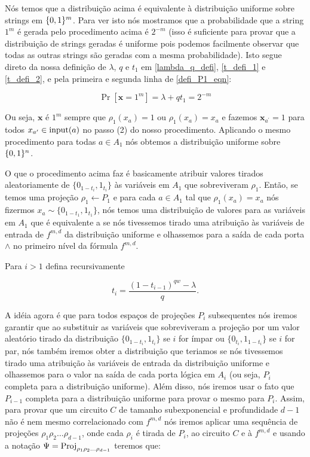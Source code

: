 Nós temos que a distribuição acima é equivalente à distribuição uniforme sobre strings em $\{0, 1\}^{m}$. Para ver isto nós mostramos que a probabilidade que a string $1^{m}$ é gerada pelo procedimento acima é $2^{-m}$ (isso é suficiente para provar que a distribuição de strings geradas é uniforme pois podemos facilmente observar que todas as outras strings são geradas com a mesma probabilidade). Isto segue direto da nossa definição de $\lambda$, $q$ e $t_{1}$ em \ref{lambda_q_defi}, \ref{t_defi_1} e \ref{t_defi_2}, e pela primeira e segunda linha de \ref{defi_P1_eqn}:

\begin{equation*}
	\Pr[\textbf{x} = 1^{m}]  = \lambda + qt_{1} = 2^{-m}
\end{equation*}

Ou seja, $\textbf{x}$ é $1^{m}$ sempre que $\rho_{1}(x_{a}) = 1$ ou $\rho_{1}(x_{a}) = x_{a}$ e fazemos $\textbf{x}_{a^{\prime}} = 1$ para todos $x_{a^{\prime}} \in \text{input}(a)$ no passo (2) do nosso procedimento. Aplicando o mesmo procedimento para todas $a \in A_{1}$ nós obtemos a distribuição uniforme sobre $\{0, 1\}^{n}$.

O que o procedimento acima faz é basicamente atribuir valores tirados aleatoriamente de $\{0_{1 - t_{i}}, 1_{t_{i}}\}$ às variáveis em $A_{1}$ que sobreviveram $\rho_{1}$. Então, se temos uma projeção $\rho_{1} \leftarrow P_{1}$ e para cada $a \in A_{1}$ tal que $\rho_{1}(x_{a}) = x_{a}$ nós fizermos $x_{a} \sim \{0_{1 - t_{1}}, 1_{t_{1}}\}$, nós temos uma distribuição de valores para as variáveis em $A_{1}$ que é equivalente a se nós tivessemos tirado uma atribuição às variáveis de entrada de $f^{m, d}$ da distribuição uniforme e olhassemos para a saída de cada porta $\land$ no primeiro nível da fórmula $f^{m, d}$.

Para $i > 1$ defina recursivamente

\begin{equation} \label{t_1_defi}
	t_{i} = \frac{(1 -  t_{i - 1})^{qw} - \lambda}{q}.
\end{equation}

A idéia agora é que para todos espaços de projeções $P_{i}$ subsequentes nós iremos garantir que ao substituir as variáveis que sobreviveram a projeção por um valor aleatório tirado da distribuição $\{0_{1 - t_{i}}, 1_{t_{i}}\}$ se $i$ for ímpar ou $\{0_{t_{i}}, 1_{1 - t_{i}}\}$ se $i$ for par, nós também iremos obter a distribuição que teriamos se nós tivessemos tirado uma atribuição às variáveis de entrada da distribuição uniforme e olhassemos para o valor na saída de cada porta lógica em $A_{i}$ (ou seja, $P_{i}$ completa para a distribuição uniforme). Além disso, nós iremos usar o fato que $P_{i - 1}$ completa para a distribuição uniforme para provar o mesmo para $P_{i}$. Assim, para provar que um circuito $C$ de tamanho subexponencial e profundidade $d - 1$ não é nem mesmo correlacionado com $f^{m, d}$ nós iremos aplicar uma sequência de projeções $\rho_{1}\rho_{2}\dots\rho_{d - 1}$, onde cada $\rho_{i}$ é tirada de $P_{i}$, ao circuito $C$ e à $f^{m, d}$ e usando a notação $\Psi = \text{Proj}_{\rho_{1}\rho_{2}\dots\rho_{d - 1}}$ teremos que:

